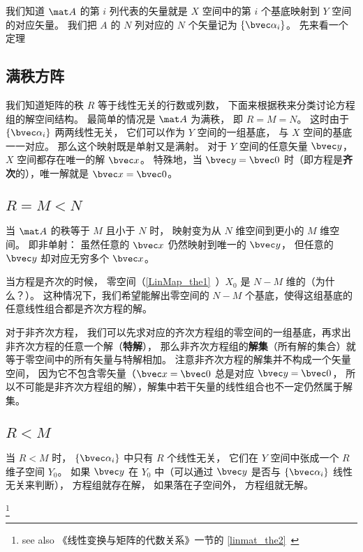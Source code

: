 我们知道 $\mat A$ 的第 $i$ 列代表的矢量就是 $X$ 空间中的第 $i$ 个基底映射到 $Y$ 空间的对应矢量。 我们把 $A$ 的 $N$ 列对应的 $N$ 个矢量记为 $\{\bvec \alpha_i\}$。 先来看一个定理

\subsection{满秩方阵}
我们知道矩阵的秩 $R$ 等于线性无关的行数或列数， 下面来根据秩来分类讨论方程组的解空间结构。 最简单的情况是 $\mat A$ 为满秩， 即 $R = M = N$。 这时由于 $\{\bvec \alpha_i\}$ 两两线性无关， 它们可以作为 $Y$ 空间的一组基底， 与 $X$ 空间的基底一一对应。 那么这个映射既是单射又是满射。%
对于 $Y$ 空间的任意矢量 $\bvec y$， $X$ 空间都存在唯一的解 $\bvec x$。 特殊地，当 $\bvec y = \bvec 0$ 时（即方程是\textbf{齐次}的），唯一解就是 $\bvec x = \bvec 0$。

\subsection{$R = M < N$}\label{LinEq_sub1}

当 $\mat A$ 的秩等于 $M$ 且小于 $N$ 时， 映射变为从 $N$ 维空间到更小的 $M$ 维空间。 即非单射： 虽然任意的 $\bvec x$ 仍然映射到唯一的 $\bvec y$， 但任意的 $\bvec y$ 却对应无穷多个 $\bvec x$。 


当方程是齐次的时候， 零空间（\autoref{LinMap_the1}~）$X_0$ 是 $N- M$ 维的（为什么？）。 这种情况下，我们希望能解出零空间的 $N - M$ 个基底，使得这组基底的任意线性组合都是齐次方程的解。

对于非齐次方程， 我们可以先求对应的齐次方程组的零空间的一组基底，再求出非齐次方程的任意一个解（\textbf{特解}）， 那么非齐次方程组的\textbf{解集}（所有解的集合）就等于零空间中的所有矢量与特解相加。 注意非齐次方程的解集并不构成一个矢量空间， 因为它不包含零矢量（$\bvec x = \bvec 0$ 总是对应 $\bvec y = \bvec 0$， 所以不可能是非齐次方程组的解），解集中若干矢量的线性组合也不一定仍然属于解集。

\subsection{$R < M$}
当 $R < M$ 时， $\{\bvec \alpha_i\}$ 中只有 $R$ 个线性无关， 它们在 $Y$ 空间中张成一个 $R$ 维子空间 $Y_0$。 如果 $\bvec y$ 在 $Y_0$ 中（可以通过 $\bvec y$ 是否与 $\{\bvec \alpha_i\}$ 线性无关来判断）， 方程组就存在解， 如果落在子空间外， 方程组就无解。

\footnote{see also 《线性变换与矩阵的代数关系》一节的 \autoref{linmat_the2}~}

